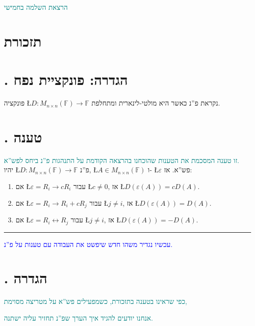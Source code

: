 \documentclass[english,hebrew]{article}
\newcommand{\sqrmn}{M_{n\times n}(\mathbb{F})}
\begin{document}
\textcolor{teal}{הרצאת השלמה בחמישי}

\section{תזכורת}

\section{{\endL}. הגדרה: פונקציית נפח}

פונקציה \L{$D:M_{n\times n}(\mathbb{F})\to\mathbb{F}$} נקראת פ\textquotedblright נ
כאשר היא מולטי-לינארית ומתחלפת.

\section{{\endL}. טענה}

\textcolor{teal}{זו טענה המסכמת את הטענות שהוכחנו בהרצאה הקודמת על
התנהגות פ\textquotedblright נ ביחס לפש\textquotedblright א.}\\

יהיו \L{$D:M_{n\times n}(\mathbb{F})\to\mathbb{F}$} פ\textquotedblright נ,
\L{$A\in\sqrmn$} ו- \L{$\varepsilon$} פש\textquotedblright א. אז:
\begin{enumerate}
\item אם \L{$\varepsilon=R_{i}\to cR_{i}$} עבור \L{$c\neq0$}, אז \L{$D(\varepsilon(A))=cD(A)$}.
\item אם \L{$\varepsilon=R_{i}\to R_{i}+cR_{j}$} עבור \L{$j\neq i$}, אז
\L{$D(\varepsilon(A))=D(A)$}.
\item אם \L{$\varepsilon=R_{i}\leftrightarrow R_{j}$} עבור \L{$j\neq i$},
אז \L{$D(\varepsilon(A))=-D(A)$}.
\end{enumerate}
\medskip{}

\rule[0.5ex]{1\columnwidth}{1pt}

\medskip{}

\textcolor{blue}{עכשיו נגדיר משהו חדש שיפשט את העבודה עם טענות על
פ\textquotedblright נ.}

\section{{\endL}. הגדרה}

\textcolor{teal}{כפי שראינו בטענה }\textcolor{teal}{{}\endL}\textcolor{teal}{{}
בתזכורת, כשמפעילים פש\textquotedblright א על מטריצה מסוימת, }

\textcolor{teal}{אנחנו יודעים להגיד איך הערך שפ\textquotedblright נ
תחזיר עליה ישתנה.}
\end{document}
